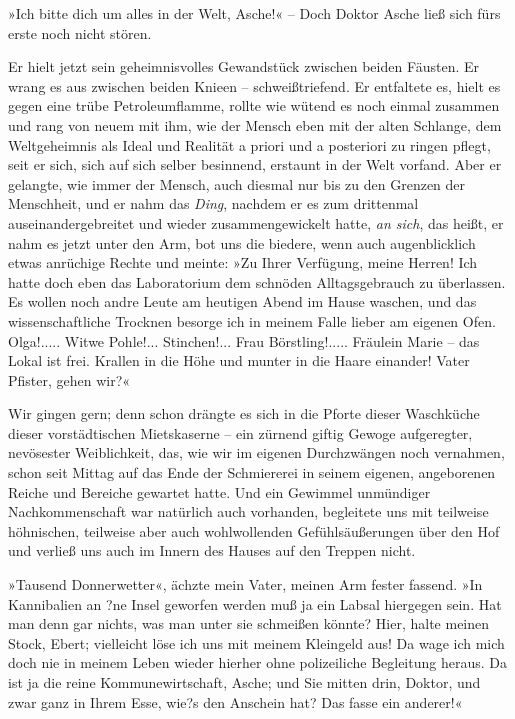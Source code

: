 »Ich bitte dich um alles in der Welt, Asche!« – Doch Doktor Asche
ließ sich fürs erste noch nicht stören.

Er hielt jetzt sein geheimnisvolles Gewandstück zwischen beiden
Fäusten. Er wrang es aus zwischen beiden Knieen – schweißtriefend.
Er entfaltete es, hielt es gegen eine trübe Petroleumflamme, rollte
wie wütend es noch einmal zusammen und rang von neuem mit ihm, wie
der Mensch eben mit der alten Schlange, dem Weltgeheimnis als Ideal
und Realität a priori und a posteriori zu ringen pflegt, seit er
sich, sich auf sich selber besinnend, erstaunt in der Welt vorfand.
Aber er gelangte, wie immer der Mensch, auch diesmal nur bis zu den
Grenzen der Menschheit, und er nahm das \emph{Ding}, nachdem er es
zum drittenmal auseinandergebreitet und wieder zusammengewickelt
hatte, \emph{an sich}, das heißt, er nahm es jetzt unter den Arm,
bot uns die biedere, wenn auch augenblicklich etwas anrüchige
Rechte und meinte: »Zu Ihrer Verfügung, meine Herren! Ich hatte
doch eben das Laboratorium dem schnöden Alltagsgebrauch zu
überlassen. Es wollen noch andre Leute am heutigen Abend im Hause
waschen, und das wissenschaftliche Trocknen besorge ich in meinem
Falle lieber am eigenen Ofen. Olga!..... Witwe Pohle!...
Stinchen!... Frau Börstling!..... Fräulein Marie – das Lokal ist
frei. Krallen in die Höhe und munter in die Haare einander! Vater
Pfister, gehen wir?«

Wir gingen gern; denn schon drängte es sich in die Pforte dieser
Waschküche dieser vorstädtischen Mietskaserne – ein zürnend giftig
Gewoge aufgeregter, nevösester Weiblichkeit, das, wie wir im
eigenen Durchzwängen noch vernahmen, schon seit Mittag auf das Ende
der Schmiererei in seinem eigenen, angeborenen Reiche und Bereiche
gewartet hatte. Und ein Gewimmel unmündiger Nachkommenschaft war
natürlich auch vorhanden, begleitete uns mit teilweise höhnischen,
teilweise aber auch wohlwollenden Gefühlsäußerungen über den Hof
und verließ uns auch im Innern des Hauses auf den Treppen nicht.

»Tausend Donnerwetter«, ächzte mein Vater, meinen Arm fester
fassend. »In Kannibalien an ?ne Insel geworfen werden muß ja ein
Labsal hiergegen sein. Hat man denn gar nichts, was man unter sie
schmeißen könnte? Hier, halte meinen Stock, Ebert; vielleicht löse
ich uns mit meinem Kleingeld aus! Da wage ich mich doch nie in
meinem Leben wieder hierher ohne polizeiliche Begleitung heraus. Da
ist ja die reine Kommunewirtschaft, Asche; und Sie mitten drin,
Doktor, und zwar ganz in Ihrem Esse, wie?s den Anschein hat? Das
fasse ein anderer!«

